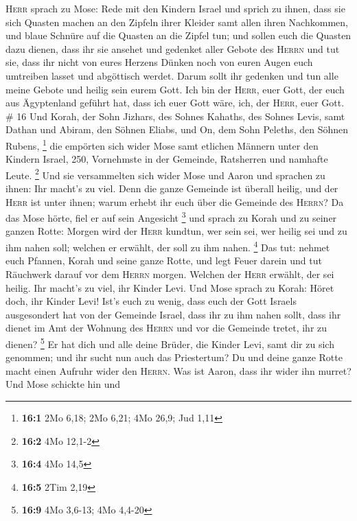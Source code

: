 \textsc{Herr} sprach zu Mose:  Rede mit den Kindern
Israel und sprich zu ihnen, dass sie sich Quasten machen an den Zipfeln
ihrer Kleider samt allen ihren Nachkommen, und blaue Schnüre auf die
Quasten an die Zipfel tun;  und sollen euch die Quasten
dazu dienen, dass ihr sie ansehet und gedenket aller Gebote des
\textsc{Herrn} und tut sie, dass ihr nicht von eures Herzens Dünken noch
von euren Augen euch umtreiben lasset und abgöttisch werdet.
 Darum sollt ihr gedenken und tun alle meine Gebote und
heilig sein eurem Gott.  Ich bin der \textsc{Herr}, euer
Gott, der euch aus Ägyptenland geführt hat, dass ich euer Gott wäre,
ich, der \textsc{Herr}, euer Gott. \# 16  Und Korah, der
Sohn Jizhars, des Sohnes Kahaths, des Sohnes Levis, samt Dathan und
Abiram, den Söhnen Eliabs, und On, dem Sohn Peleths, den Söhnen Rubens,
\footnote{\textbf{16:1} 2Mo 6,18; 2Mo 6,21; 4Mo 26,9; Jud 1,11}
 die empörten sich wider Mose samt etlichen Männern unter
den Kindern Israel, 250, Vornehmste in der Gemeinde, Ratsherren und
namhafte Leute. \footnote{\textbf{16:2} 4Mo 12,1-2}  Und
sie versammelten sich wider Mose und Aaron und sprachen zu ihnen: Ihr
macht's zu viel. Denn die ganze Gemeinde ist überall heilig, und der
\textsc{Herr} ist unter ihnen; warum erhebt ihr euch über die Gemeinde
des \textsc{Herrn}?  Da das Mose hörte, fiel er auf sein
Angesicht \footnote{\textbf{16:4} 4Mo 14,5}  und sprach zu
Korah und zu seiner ganzen Rotte: Morgen wird der \textsc{Herr} kundtun,
wer sein sei, wer heilig sei und zu ihm nahen soll; welchen er erwählt,
der soll zu ihm nahen. \footnote{\textbf{16:5} 2Tim 2,19} 
Das tut: nehmet euch Pfannen, Korah und seine ganze Rotte,
 und legt Feuer darein und tut Räuchwerk darauf vor dem
\textsc{Herrn} morgen. Welchen der \textsc{Herr} erwählt, der sei
heilig. Ihr macht's zu viel, ihr Kinder Levi.  Und Mose
sprach zu Korah: Höret doch, ihr Kinder Levi!  Ist's euch
zu wenig, dass euch der Gott Israels ausgesondert hat von der Gemeinde
Israel, dass ihr zu ihm nahen sollt, dass ihr dienet im Amt der Wohnung
des \textsc{Herrn} und vor die Gemeinde tretet, ihr zu dienen?
\footnote{\textbf{16:9} 4Mo 3,6-13; 4Mo 4,4-20}  Er hat
dich und alle deine Brüder, die Kinder Levi, samt dir zu sich genommen;
und ihr sucht nun auch das Priestertum?  Du und deine
ganze Rotte macht einen Aufruhr wider den \textsc{Herrn}. Was ist Aaron,
dass ihr wider ihn murret?  Und Mose schickte hin und
